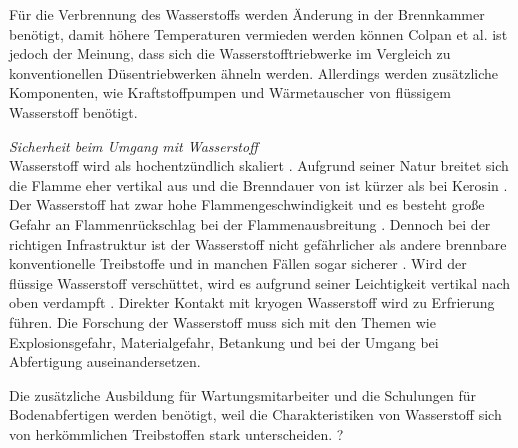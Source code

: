 Für die Verbrennung des Wasserstoffs werden Änderung in der Brennkammer benötigt, damit höhere Temperaturen vermieden werden können \cite{khandelwal2013hydrogen}
Colpan et al. \cite{colpan2022fuel} ist jedoch der Meinung, dass sich die Wasserstofftriebwerke im Vergleich zu konventionellen Düsentriebwerken ähneln werden. 
Allerdings werden zusätzliche Komponenten, wie Kraftstoffpumpen und Wärmetauscher von flüssigem Wasserstoff benötigt.






\textit{Sicherheit beim Umgang mit Wasserstoff}\\
Wasserstoff wird als hochentzündlich skaliert \cite{dalmia2022powering}. Aufgrund seiner Natur breitet sich die Flamme eher 
vertikal aus und die Brenndauer von  ist kürzer als bei Kerosin \cite{colpan2022fuel}.
Der Wasserstoff hat zwar hohe Flammengeschwindigkeit und es besteht große Gefahr an Flammenrückschlag bei der Flammenausbreitung \cite{khandelwal2013hydrogen}.
Dennoch bei der richtigen Infrastruktur ist der Wasserstoff nicht gefährlicher als andere brennbare konventionelle Treibstoffe und in manchen 
Fällen sogar sicherer \cite{khandelwal2013hydrogen}. 
Wird der flüssige Wasserstoff verschüttet, wird es aufgrund seiner Leichtigkeit vertikal nach oben verdampft \cite{colpan2022fuel}. 
Direkter Kontakt mit kryogen Wasserstoff wird zu Erfrierung führen.
Die Forschung der Wasserstoff muss sich mit den Themen wie Explosionsgefahr, Materialgefahr, Betankung und 
bei der Umgang bei Abfertigung auseinandersetzen. 


Die zusätzliche Ausbildung für Wartungsmitarbeiter und die Schulungen für Bodenabfertigen
werden benötigt, weil die Charakteristiken von Wasserstoff 
sich von herkömmlichen Treibstoffen stark unterscheiden. \cite{mulder2019outlook}?


